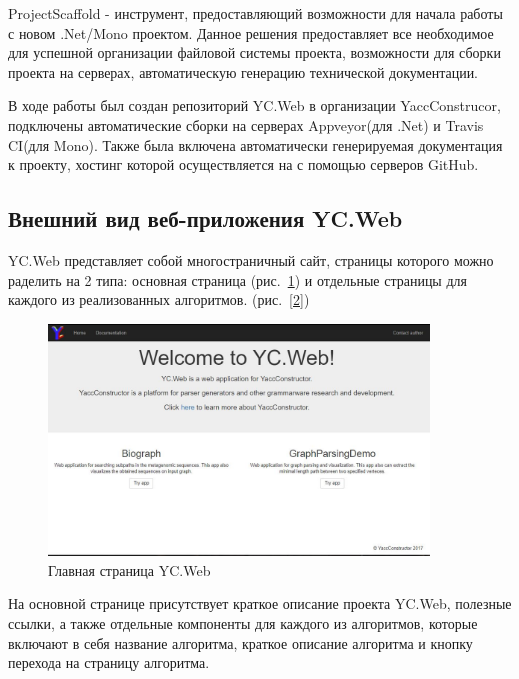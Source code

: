 \documentclass[14pt]{matmex-diploma}
\begin{document}
ProjectScaffold - инструмент, предоставляющий возможности для начала работы с новом .Net/Mono проектом. Данное решения предоставляет все необходимое для успешной организации файловой системы проекта, возможности для сборки проекта на серверах, автоматическую генерацию технической документации.

В ходе работы был создан репозиторий YC.Web в организации \linebreak YaccConstrucor, подключены автоматические сборки на серверах \linebreak Appveyor(для .Net) и Travis CI(для Mono). Также была включена автоматически генерируемая документация к проекту, хостинг которой осуществляется на с помощью серверов GitHub.

\subsection{Внешний вид веб-приложения YC.Web}

YC.Web представляет собой многостраничный сайт, страницы которого можно раделить на 2 типа: основная страница (рис.~\ref{1}) и отдельные страницы для каждого из реализованных алгоритмов. (рис.~\ref{2})

\begin{figure}[h]
\label{1}
\centering
\includegraphics[width=0.9\textwidth]{pictures/main.jpg}
\caption{Главная страница YC.Web}
\end{figure}

\newpage
На основной странице присутствует краткое описание проекта \linebreak YC.Web, полезные ссылки, а также отдельные компоненты для каждого из алгоритмов, которые включают в себя название алгоритма, краткое описание алгоритма и кнопку перехода на страницу алгоритма.
\end{document}
